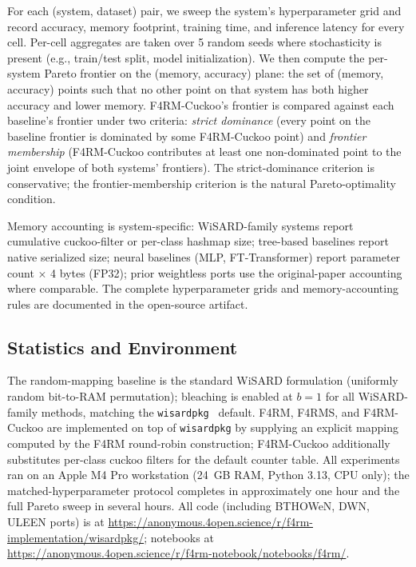 For each (system, dataset) pair, we sweep the system's hyperparameter grid and record accuracy, memory footprint, training time, and inference latency for every cell. Per-cell aggregates are taken over 5 random seeds where stochasticity is present (e.g., train/test split, model initialization). We then compute the per-system Pareto frontier on the (memory, accuracy) plane: the set of (memory, accuracy) points such that no other point on that system has both higher accuracy and lower memory. F4RM-Cuckoo's frontier is compared against each baseline's frontier under two criteria: \emph{strict dominance} (every point on the baseline frontier is dominated by some F4RM-Cuckoo point) and \emph{frontier membership} (F4RM-Cuckoo contributes at least one non-dominated point to the joint envelope of both systems' frontiers). The strict-dominance criterion is conservative; the frontier-membership criterion is the natural Pareto-optimality condition.

Memory accounting is system-specific: WiSARD-family systems report cumulative cuckoo-filter or per-class hashmap size; tree-based baselines report native serialized size; neural baselines (MLP, FT-Transformer) report parameter count $\times$ 4 bytes (FP32); prior weightless ports use the original-paper accounting where comparable. The complete hyperparameter grids and memory-accounting rules are documented in the open-source artifact.

\subsection{Statistics and Environment}
\label{sec:method-stats}

The random-mapping baseline is the standard WiSARD formulation (uniformly random bit-to-RAM permutation); bleaching is enabled at $b = 1$ for all WiSARD-family methods, matching the \texttt{wisardpkg}~\cite{wisardpkg} default. F4RM, F4RMS, and F4RM-Cuckoo are implemented on top of \texttt{wisardpkg} by supplying an explicit mapping computed by the F4RM round-robin construction; F4RM-Cuckoo additionally substitutes per-class cuckoo filters for the default counter table. All experiments ran on an Apple M4 Pro workstation (24~GB RAM, Python 3.13, CPU only); the matched-hyperparameter protocol completes in approximately one hour and the full Pareto sweep in several hours. All code (including BTHOWeN, DWN, ULEEN ports) is at \url{https://anonymous.4open.science/r/f4rm-implementation/wisardpkg/}; notebooks at \url{https://anonymous.4open.science/r/f4rm-notebook/notebooks/f4rm/}.


